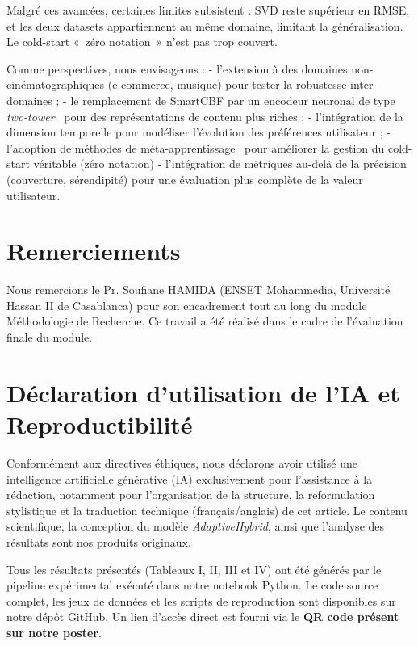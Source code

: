 \documentclass[conference]{IEEEtran}
\begin{document}
Malgré ces avancées, certaines limites subsistent : SVD reste supérieur en
RMSE, et les deux datasets appartiennent au même domaine, limitant la
généralisation. Le cold-start «~zéro notation~» n'est pas trop couvert.

Comme perspectives, nous envisageons : 
- l'extension à des domaines
non-cinématographiques (e-commerce, musique) pour tester la robustesse
inter-domaines ; 
- le remplacement de SmartCBF par un encodeur neuronal de
type \textit{two-tower}~\cite{yu2023} pour des représentations de contenu
plus riches ; 
- l'intégration de la dimension temporelle pour modéliser
l'évolution des préférences utilisateur ; 
- l'adoption de méthodes de
méta-apprentissage~\cite{dong2020} pour améliorer la gestion du cold-start
véritable (zéro notation)
- l'intégration de métriques
au-delà de la précision~\cite{ge2021} (couverture, sérendipité) pour
une évaluation plus complète de la valeur utilisateur.


\section*{Remerciements}

Nous remercions le Pr. Soufiane HAMIDA (ENSET Mohammedia,
Université Hassan II de Casablanca) pour son encadrement tout au long du
module Méthodologie de Recherche. Ce travail a été réalisé dans le cadre
de l'évaluation finale du module.


\section*{Déclaration d'utilisation de l'IA et Reproductibilité}
Conformément aux directives éthiques, nous déclarons avoir utilisé une intelligence artificielle générative (IA) exclusivement pour l'assistance à la rédaction, notamment pour l'organisation de la structure, la reformulation stylistique et la traduction technique (français/anglais) de cet article. Le contenu scientifique, la conception du modèle \textit{AdaptiveHybrid}, ainsi que l'analyse des résultats sont nos produits originaux. 

Tous les résultats présentés (Tableaux I, II, III et IV) ont été générés par le pipeline expérimental exécuté dans notre notebook Python. Le code source complet, les jeux de données et les scripts de reproduction sont disponibles sur notre dépôt GitHub. Un lien d'accès direct est fourni via le \textbf{QR code présent sur notre poster}.
\end{document}
